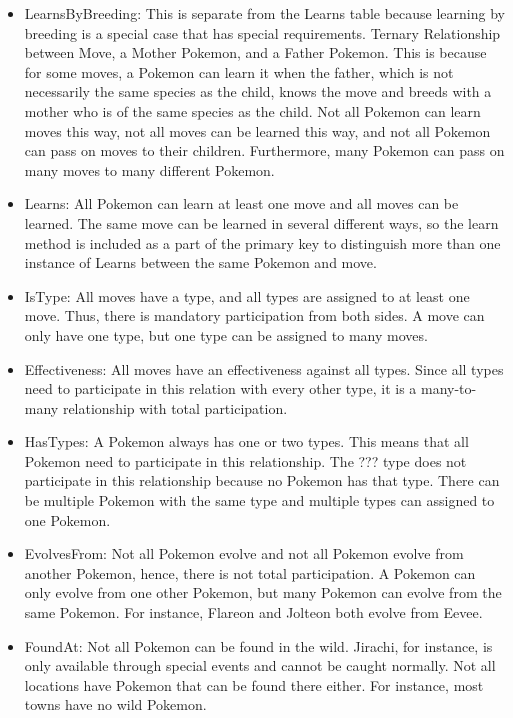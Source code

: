 \documentclass{article}
\begin{document}
\begin{itemize}
	\item LearnsByBreeding:
		This is separate from the Learns table because learning by breeding is a special case
		that has special requirements.
		Ternary Relationship between Move, a Mother Pokemon, and a Father Pokemon.
		This is because for some moves, a Pokemon can learn it when the father,
		which is not necessarily the same species as the child, knows the move and breeds
		with a mother who is of the same species as the child.
		Not all Pokemon can learn moves this way, not all moves can be learned this way, 
		and not all Pokemon can pass on moves to their children.
		Furthermore, many Pokemon can pass on many moves to many different Pokemon.
	\item Learns:
		All Pokemon can learn at least one move and all moves can be learned.
		The same move can be learned in several different ways, so the learn method
		is included as a part of the primary key to distinguish more than one 
		instance of Learns between the same Pokemon and move.
	\item IsType: 
		All moves have a type, and all types are assigned to at least one move.
		Thus, there is mandatory participation from both sides.
		A move can only have one type, but one type can be assigned to many moves.
	\item Effectiveness:
		All moves have an effectiveness against all types.
		Since all types need to participate in this relation with every other type,
		it is a many-to-many relationship with total participation.
	\item HasTypes:
		A Pokemon always has one or two types. This means that all Pokemon need to participate
		in this relationship. The ??? type does not participate in this relationship
		because no Pokemon has that type. There can be multiple Pokemon
		with the same type and multiple types can assigned to one Pokemon.
	\item EvolvesFrom:
		Not all Pokemon evolve and not all Pokemon evolve from another Pokemon,
		hence, there is not total participation.
		A Pokemon can only evolve from one other Pokemon,
		but many Pokemon can evolve from the same Pokemon.
		For instance, Flareon and Jolteon both evolve from Eevee.
	\item FoundAt:
		Not all Pokemon can be found in the wild. Jirachi, for instance,
		is only available through special events and cannot be caught normally.
		Not all locations have Pokemon that can be found there either. 
		For instance, most towns have no wild Pokemon.

\end{itemize}
\end{document}
